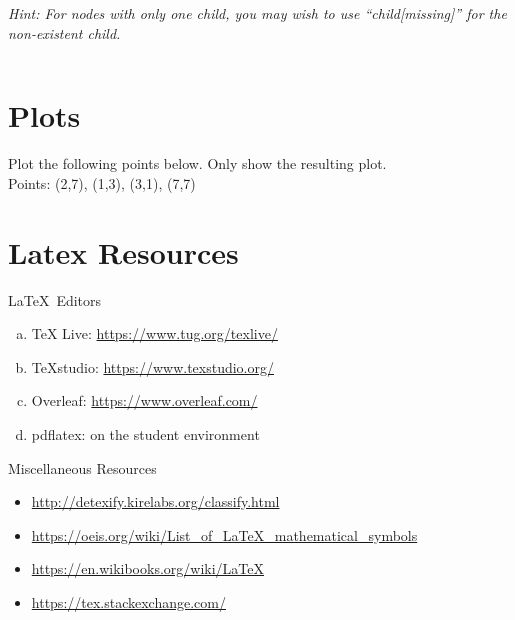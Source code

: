 \documentclass[12pt]{article}
\begin{document}
{\it Hint: For nodes with only one child, you may wish to use ``child[missing]'' for the non-existent child.}


\[ \] \[ \] \[ \] \[ \] \[ \] \[ \] \[ \] \[ \]
\section{Plots}

Plot the following points below. Only show the resulting plot.\\
Points: (2,7), (1,3), (3,1), (7,7)

\begin{center}
\end{center}

\section{Latex Resources}
 \LaTeX\ Editors

 \begin{enumerate}[a)]
 \item{TeX Live: \url{https://www.tug.org/texlive/}}
 \item{TeXstudio: \url{https://www.texstudio.org/}}
 \item{Overleaf: \url{https://www.overleaf.com/}}
 \item{pdflatex: on the student environment}
 \end{enumerate} 
 \bigskip
 
 Miscellaneous Resources
 \begin{itemize}
 \item{\url{http://detexify.kirelabs.org/classify.html}}
 \item{\url{https://oeis.org/wiki/List_of_LaTeX_mathematical_symbols}}
 \item{\url{https://en.wikibooks.org/wiki/LaTeX}}
 \item{\url{https://tex.stackexchange.com/}}
 \end{itemize}
\end{document}
